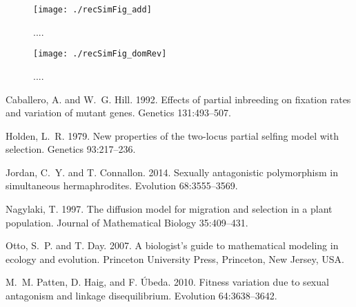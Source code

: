 \documentclass{article}
\begin{document}
\begin{figure}[!ht]
\texttt{[image: ./recSimFig\_add]}
\caption{....}
\label{Fig:recSimFig_add.pdf}
\end{figure}
\newpage{}


\begin{figure}[!ht]
\texttt{[image: ./recSimFig\_domRev]}
\caption{....}
\label{Fig:recSimFig_domRev.pdf}
\end{figure}
\newpage{}




\begin{thebibliography}{}

Caballero, A. and W.~G. Hill. 1992.
\newblock Effects of partial inbreeding on fixation rates and variation of mutant genes.
\newblock Genetics 131:493--507.

Holden, L.~R. 1979.
\newblock New properties of the two-locus partial selfing model with selection.
\newblock Genetics 93:217--236.

Jordan, C.~Y. and T. Connallon. 2014.
\newblock Sexually antagonistic polymorphism in simultaneous hermaphrodites.
\newblock Evolution 68:3555--3569.

Nagylaki, T. 1997.
\newblock The diffusion model for migration and selection in a plant population.
\newblock Journal of Mathematical Biology 35:409--431.

Otto, S.~P. and T. Day. 2007.
\newblock A biologist's guide to mathematical modeling in ecology and evolution.
\newblock Princeton University Press, Princeton, New Jersey, USA.

M.~M. Patten, D. Haig, and F. \'{U}beda. 2010.
\newblock Fitness variation due to sexual antagonism and linkage disequilibrium.
\newblock Evolution 64:3638--3642.


\end{thebibliography}
\end{document}
